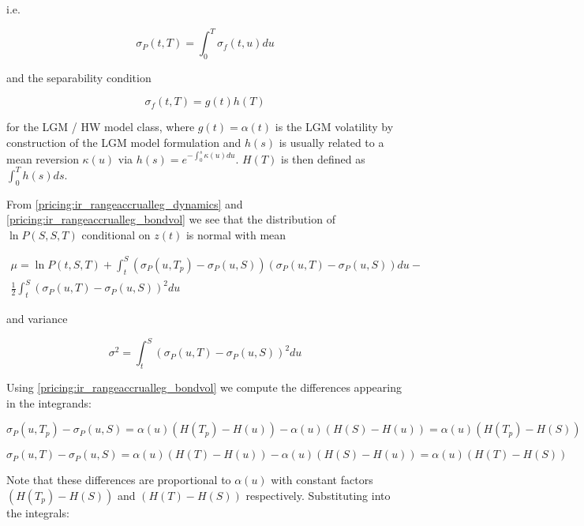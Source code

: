 i.e.

\begin{equation}
\sigma_P(t,T) = \int_0^T \sigma_f(t,u) du
\end{equation}

and the separability condition

\begin{equation}
\sigma_f(t,T) = g(t)h(T)
\end{equation}

for the LGM / HW model class, where $g(t) = \alpha(t)$ is the LGM volatility by construction of the LGM model
formulation and $h(s)$ is usually related to a mean reversion $\kappa(u)$ via $h(s) = e^{-\int_0^s \kappa(u) du}$.
$H(T)$ is then defined as $\int_0^T h(s) ds$.

From \ref{pricing:ir_rangeaccrualleg_dynamics} and \ref{pricing:ir_rangeaccrualleg_bondvol} we see that the distribution
of $\ln P(S,S,T)$ conditional on $z(t)$ is normal with mean

\begin{equation}
\begin{split}
\mu = \ln P(t,S,T) + \int_t^S ( \sigma_P(u,T_p) - \sigma_P(u,S) )( \sigma_P(u,T) - \sigma_P(u,S) ) du - \\
 \frac{1}{2} \int_t^S ( \sigma_P(u,T) - \sigma_P(u,S) )^2 du
\end{split}
\end{equation}

and variance

\begin{equation}
\sigma^2 = \int_t^S ( \sigma_P(u,T) - \sigma_P(u,S) )^2 du
\end{equation}

Using \ref{pricing:ir_rangeaccrualleg_bondvol} we compute the differences appearing in the integrands:

\begin{equation}
\sigma_P(u,T_p) - \sigma_P(u,S) = \alpha(u)(H(T_p) - H(u)) - \alpha(u)(H(S) - H(u)) = \alpha(u)(H(T_p) - H(S))
\end{equation}

\begin{equation}
\sigma_P(u,T) - \sigma_P(u,S) = \alpha(u)(H(T) - H(u)) - \alpha(u)(H(S) - H(u)) = \alpha(u)(H(T) - H(S))
\end{equation}

Note that these differences are proportional to $\alpha(u)$ with constant factors $(H(T_p)-H(S))$ and $(H(T)-H(S))$
respectively. Substituting into the integrals:

